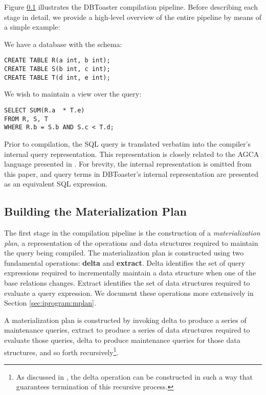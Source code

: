 Figure \ref{} illustrates the DBToaster compilation pipeline.  Before describing each stage in detail, we provide a high-level overview of the entire pipeline by means of a simple example:

\begin{example}
\label{ex:compiler:rst}
We have a database with the schema: 
\begin{verbatim}
CREATE TABLE R(a int, b int); 
CREATE TABLE S(b int, c int);
CREATE TABLE T(d int, e int);
\end{verbatim}

We wish to maintain a view over the query:
\begin{verbatim}
SELECT SUM(R.a  * T.e)
FROM R, S, T
WHERE R.b = S.b AND S.c < T.d;
\end{verbatim}
\end{example}

Prior to compilation, the SQL query is translated verbatim into the compiler's internal query representation.  This representation is closely related to the AGCA language presented in \cite{dbtoaster-pods}.  For brevity, the internal representation is omitted from this paper, and query terms in DBToaster's internal representation are presented as an equivalent SQL expression.  

\subsection{Building the Materialization Plan}
The first stage in the compilation pipeline is the construction of a {\em materialization plan}, a representation of the operations and data structures required to maintain the query being compiled.  The materialization plan is constructed using two fundamental operations: {\bf delta} and {\bf extract}.  Delta identifies the set of query expressions required to incrementally maintain a data structure when one of the base relations changes.  Extract identifies the set of data structures required to evaluate a query expression.  We document these operations more extensively in Section \ref{sec:iprogram:mplan}. 

A materialization plan is constructed by invoking delta to produce a series of maintenance queries, extract to produce a series of data structures required to evaluate those queries, delta to produce maintenance queries for those data structures, and so forth recursively\footnote{As discussed in \cite{dbtoaster-pods}, the delta operation can be constructed in such a way that guarantees termination of this recursive process.}.  


